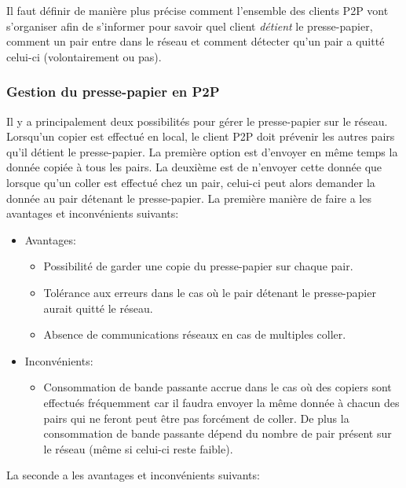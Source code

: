 Il faut définir de manière plus précise comment l'ensemble des clients P2P
vont s'organiser afin de s'informer pour savoir quel client \emph{détient} le
presse-papier, comment un pair entre dans le réseau et comment détecter
qu'un pair a quitté celui-ci (volontairement ou pas).

\subsubsection{Gestion du presse-papier en P2P}
Il y a principalement deux possibilités pour gérer le presse-papier
sur le réseau. Lorsqu'un copier est effectué en local, le client P2P
doit prévenir les autres pairs qu'il détient le presse-papier.
La première option est d'envoyer en même temps la donnée copiée à tous les
pairs. La deuxième est de n'envoyer cette donnée que lorsque qu'un coller
est effectué chez un pair, celui-ci peut alors demander la donnée au pair
détenant le presse-papier.
La première manière de faire a les avantages et inconvénients suivants:
\begin{itemize}
\item Avantages:
  \begin{itemize}
  \item Possibilité de garder une copie du presse-papier sur chaque pair.
  \item Tolérance aux erreurs dans le cas où le pair détenant le presse-papier
    aurait quitté le réseau.
  \item Absence de communications réseaux en cas de multiples coller.
  \end{itemize}
\item Inconvénients:
  \begin{itemize}
  \item Consommation de bande passante accrue dans le cas où des copiers
    sont effectués fréquemment car il faudra envoyer la même donnée à chacun
    des pairs qui ne feront peut être pas forcément de coller. De plus la
    consommation de bande passante dépend du nombre de pair présent sur le
    réseau (même si celui-ci reste faible).
  \end{itemize}
\end{itemize}
La seconde a les avantages et inconvénients suivants:
